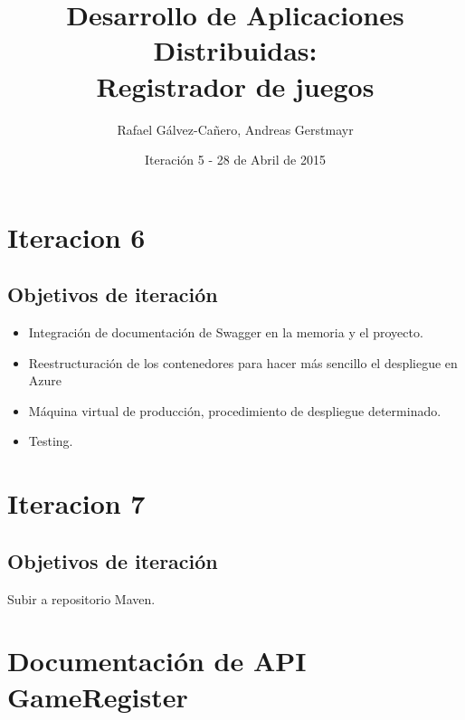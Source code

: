 \documentclass[12pt,a4paper]{report}
\title{Desarrollo de Aplicaciones Distribuidas: \\ Registrador de juegos}
\author{Rafael Gálvez-Cañero, Andreas Gerstmayr}
\date{Iteración 5 - 28 de Abril de 2015} %
\begin{document}
\maketitle
\tableofcontents
\listoffigures
\listoftables











 
\chapter{Iteracion 6}
\section{Objetivos de iteración}
\begin{itemize}
 \item Integración de documentación de Swagger en la memoria y el proyecto.
 \item Reestructuración de los contenedores para hacer más sencillo el despliegue en Azure
 \item Máquina virtual de producción, procedimiento de despliegue determinado.
 \item Testing.
\end{itemize}

\chapter{Iteracion 7}
\section{Objetivos de iteración}
Subir a repositorio Maven.

\chapter{Documentación de API GameRegister}

\end{document}
